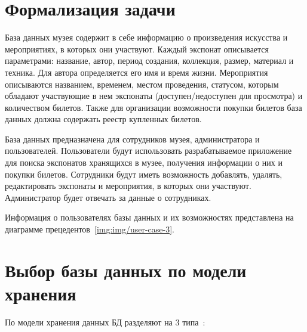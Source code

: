 
\clearpage
  
\section{Формализация задачи}
База данных музея содержит в себе информацию о произведения искусства и мероприятиях, в которых они участвуют. Каждый экспонат описывается параметрами: название, автор, период создания, коллекция, размер, материал и техника. Для автора определяется его имя и время жизни. Мероприятия описываются названием, временем, местом проведения, статусом, которым обладают участвующие в нем экспонаты (доступен/недоступен для просмотра) и количеством билетов. Также для организации возможности покупки билетов база данных должна содержать реестр купленных билетов.

База данных предназначена для сотрудников музея, администратора и пользователей. 
Пользователи будут использовать разрабатываемое приложение для поиска экспонатов хранящихся в музее, получения информации о них и покупки билетов. Сотрудники будут иметь возможность добавлять, удалять, редактировать экспонаты и мероприятия, в которых они участвуют. Администратор будет отвечать за данные о сотрудниках. 

Информация о пользователях базы данных и их возможностях представлена на диаграмме прецедентов~\ref{img:img/user-case-3}.

\FloatBarrier
{}
\FloatBarrier

\clearpage

\section{Выбор базы данных по модели хранения}

По модели хранения данных БД разделяют на 3 типа~\cite{introDBsys}:

